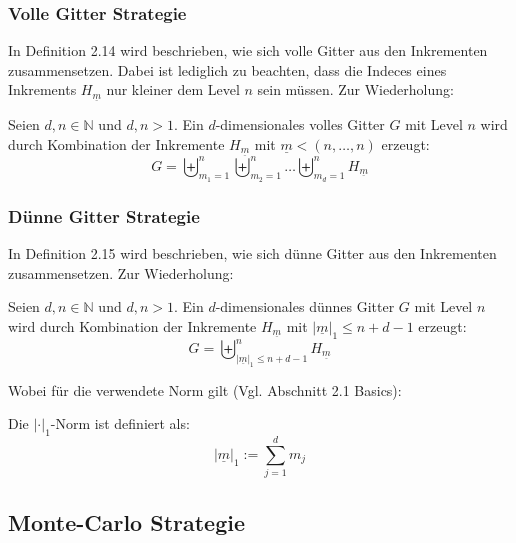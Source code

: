 \documentclass[a4paper,12pt]{llncs}
\numberwithin{equation}{section}
\begin{document}
\subsubsection{Volle Gitter Strategie}

In \cite{M13} Definition 2.14 wird beschrieben, wie sich volle Gitter aus den Inkrementen zusammensetzen. Dabei ist lediglich zu beachten, dass die Indeces eines Inkrements $H_{\underline{m}}$ nur kleiner dem Level $n$ sein müssen.  Zur Wiederholung:

\begin{definition}
	Seien $d,n\in\mathbb{N}$ und $d,n>1$. Ein $d$-dimensionales volles Gitter $G$ mit Level $n$ wird durch Kombination der Inkremente $H_{\underline{m}}$ mit $\underline{m}<(n,\dots,n)$ erzeugt:
	\begin{equation}
		G=\biguplus_{m_1=1}^n\biguplus_{m_2=1}^n\dots \biguplus_{m_d=1}^n H_{\underline{m}}
	\end{equation}
\end{definition}

\subsubsection{Dünne Gitter Strategie}

In \cite{M13} Definition 2.15 wird beschrieben, wie sich dünne Gitter aus den Inkrementen zusammensetzen. Zur Wiederholung:

\begin{definition}
	Seien $d,n\in\mathbb{N}$ und $d,n>1$. Ein $d$-dimensionales dünnes Gitter $G$ mit Level $n$ wird durch Kombination der Inkremente $H_{\underline{m}}$ mit $|\underline{m}|_1\leq n+d-1$ erzeugt:
	\begin{equation}
	G=\biguplus_{|\underline{m}|_1\leq n+d-1}^n H_{\underline{m}}
	\end{equation}
\end{definition}

Wobei für die verwendete Norm gilt (Vgl. \cite{P10} Abschnitt 2.1 Basics):

\begin{definition}
Die  $|\cdot|_1$-Norm ist definiert als:
	\begin{equation}
	|\underline{m}|_1:=\sum_{j=1}^d m_j
	\end{equation}
\end{definition}


\subsection{Monte-Carlo Strategie}
\end{document}
